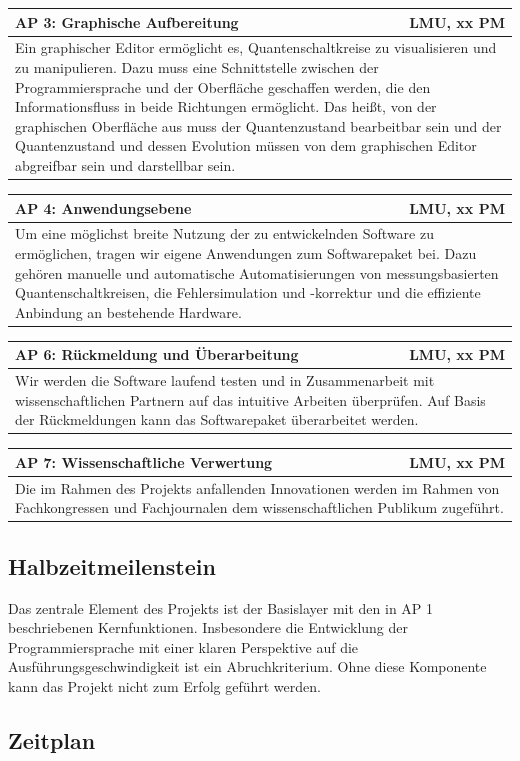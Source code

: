 \documentclass[11pt, a4paper]{article}
\newcommand{\instruction}[1]{{}}
\newcommand{\workpackage}[3]{
    \noindent
    \begin{tabularx}{\textwidth}{|X|r|}
        \hline
        \textbf{#1} & #2 \\
        \hline
        \multicolumn{2}{|p{\dimexpr\textwidth-2\tabcolsep-2\arrayrulewidth}|}{#3} \\
        \hline
    \end{tabularx}
    \vspace{1.5em}
}
\begin{document}
\workpackage{AP 3: Graphische Aufbereitung}{LMU, xx PM}{Ein
  graphischer Editor ermöglicht es, Quantenschaltkreise zu
  visualisieren und zu manipulieren. Dazu muss eine Schnittstelle
  zwischen der Programmiersprache und der Oberfläche geschaffen
  werden, die den Informationsfluss in beide Richtungen
  ermöglicht. Das heißt, von der graphischen Oberfläche aus muss der
  Quantenzustand bearbeitbar sein und der Quantenzustand und dessen
  Evolution müssen von dem graphischen Editor abgreifbar sein und
  darstellbar sein.}

\workpackage{AP 4: Anwendungsebene}{LMU, xx PM}{Um eine möglichst
  breite Nutzung der zu entwickelnden Software zu ermöglichen, tragen
  wir eigene Anwendungen zum Softwarepaket bei. Dazu gehören manuelle
  und automatische Automatisierungen von messungsbasierten
  Quantenschaltkreisen, die Fehlersimulation und -korrektur und die
  effiziente Anbindung an bestehende Hardware.}

\workpackage{AP 6: Rückmeldung und Überarbeitung}{LMU, xx PM}{Wir
  werden die Software laufend testen und in Zusammenarbeit mit
  wissenschaftlichen Partnern auf das intuitive Arbeiten
  überprüfen. Auf Basis der Rückmeldungen kann das Softwarepaket
  überarbeitet werden.}

\workpackage{AP 7: Wissenschaftliche Verwertung}{LMU, xx PM}{Die im
  Rahmen des Projekts anfallenden Innovationen werden im Rahmen von
  Fachkongressen und Fachjournalen dem wissenschaftlichen Publikum
  zugeführt.}



\subsection{Halbzeitmeilenstein}

\instruction{Zwingend ein quantitativ überprüfbarer Meilenstein zur Mitte der Laufzeit.}

Das zentrale Element des Projekts ist der Basislayer mit den in AP 1
beschriebenen Kernfunktionen. Insbesondere die Entwicklung der
Programmiersprache mit einer klaren Perspektive auf die
Ausführungsgeschwindigkeit ist ein Abruchkriterium. Ohne diese
Komponente kann das Projekt nicht zum Erfolg geführt werden.

\subsection{Zeitplan}
\instruction{Überblick über Ablauf und technologische Erfolgsrisiken.} 
\end{document}
